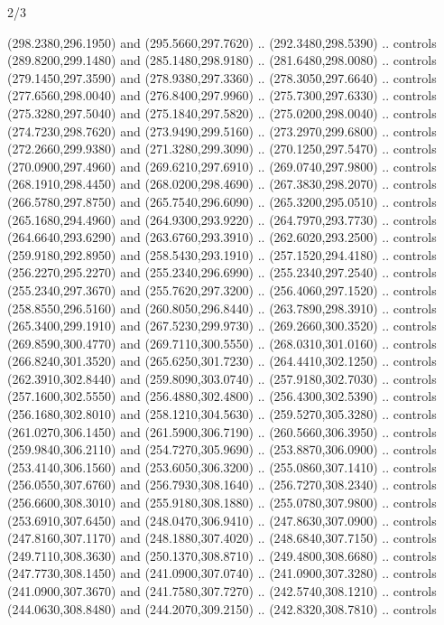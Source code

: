 \begin{flagdescription}{2/3}
\begin{scope}[xshift=0.5\flaglength,yshift=0.5\flagwidth,scale=\stretchfactor]
\begin{scope}[scale=0.001645\flagwidth,yshift=65mm,xshift=-63mm]
\begin{scope}[y=0.80pt, x=0.80pt, yscale=-1,]
\begin{scope}[cm={{1.33333,0.0,0.0,1.33333,(0.0,1e-05)}}]
  (298.2380,296.1950) and (295.5660,297.7620) .. (292.3480,298.5390) .. controls
  (289.8200,299.1480) and (285.1480,298.9180) .. (281.6480,298.0080) .. controls
  (279.1450,297.3590) and (278.9380,297.3360) .. (278.3050,297.6640) .. controls
  (277.6560,298.0040) and (276.8400,297.9960) .. (275.7300,297.6330) .. controls
  (275.3280,297.5040) and (275.1840,297.5820) .. (275.0200,298.0040) .. controls
  (274.7230,298.7620) and (273.9490,299.5160) .. (273.2970,299.6800) .. controls
  (272.2660,299.9380) and (271.3280,299.3090) .. (270.1250,297.5470) .. controls
  (270.0900,297.4960) and (269.6210,297.6910) .. (269.0740,297.9800) .. controls
  (268.1910,298.4450) and (268.0200,298.4690) .. (267.3830,298.2070) .. controls
  (266.5780,297.8750) and (265.7540,296.6090) .. (265.3200,295.0510) .. controls
  (265.1680,294.4960) and (264.9300,293.9220) .. (264.7970,293.7730) .. controls
  (264.6640,293.6290) and (263.6760,293.3910) .. (262.6020,293.2500) .. controls
  (259.9180,292.8950) and (258.5430,293.1910) .. (257.1520,294.4180) .. controls
  (256.2270,295.2270) and (255.2340,296.6990) .. (255.2340,297.2540) .. controls
  (255.2340,297.3670) and (255.7620,297.3200) .. (256.4060,297.1520) .. controls
  (258.8550,296.5160) and (260.8050,296.8440) .. (263.7890,298.3910) .. controls
  (265.3400,299.1910) and (267.5230,299.9730) .. (269.2660,300.3520) .. controls
  (269.8590,300.4770) and (269.7110,300.5550) .. (268.0310,301.0160) .. controls
  (266.8240,301.3520) and (265.6250,301.7230) .. (264.4410,302.1250) .. controls
  (262.3910,302.8440) and (259.8090,303.0740) .. (257.9180,302.7030) .. controls
  (257.1600,302.5550) and (256.4880,302.4800) .. (256.4300,302.5390) .. controls
  (256.1680,302.8010) and (258.1210,304.5630) .. (259.5270,305.3280) .. controls
  (261.0270,306.1450) and (261.5900,306.7190) .. (260.5660,306.3950) .. controls
  (259.9840,306.2110) and (254.7270,305.9690) .. (253.8870,306.0900) .. controls
  (253.4140,306.1560) and (253.6050,306.3200) .. (255.0860,307.1410) .. controls
  (256.0550,307.6760) and (256.7930,308.1640) .. (256.7270,308.2340) .. controls
  (256.6600,308.3010) and (255.9180,308.1880) .. (255.0780,307.9800) .. controls
  (253.6910,307.6450) and (248.0470,306.9410) .. (247.8630,307.0900) .. controls
  (247.8160,307.1170) and (248.1880,307.4020) .. (248.6840,307.7150) .. controls
  (249.7110,308.3630) and (250.1370,308.8710) .. (249.4800,308.6680) .. controls
  (247.7730,308.1450) and (241.0900,307.0740) .. (241.0900,307.3280) .. controls
  (241.0900,307.3670) and (241.7580,307.7270) .. (242.5740,308.1210) .. controls
  (244.0630,308.8480) and (244.2070,309.2150) .. (242.8320,308.7810) .. controls

\end{scope}
\end{scope}
\end{scope}
\end{scope}
\end{flagdescription}
